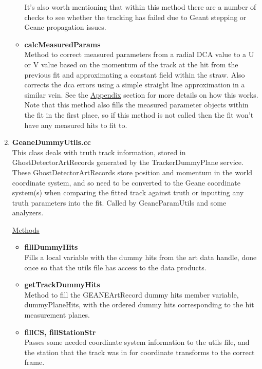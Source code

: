 \begin{enumerate}
\begin{itemize}
          It's also worth mentioning that within this method there are a number of checks to see whether the tracking has failed due to Geant stepping or Geane propagation issues.

          \item{\bf{calcMeasuredParams}} \\ 
          Method to correct measured parameters from a radial DCA value to a U or V value based on the momentum of the track at the hit from the previous fit and approximating a constant field within the straw. Also corrects the dca errors using a simple straight line approximation in a similar vein. See the \hyperref[sec:Appendix]{Appendix} section for more details on how this works. Note that this method also fills the measured parameter objects within the fit in the first place, so if this method is not called then the fit won't have any measured hits to fit to.

        \end{itemize}

      \item{\bf{GeaneDummyUtils.cc}} \\
      This class deals with truth track information, stored in GhostDetectorArtRecords generated by the TrackerDummyPlane service. These GhostDetectorArtRecords store position and momentum in the world coordinate system, and so need to be converted to the Geane coordinate system(s) when comparing the fitted track against truth or inputting any truth parameters into the fit. Called by GeaneParamUtils and some analyzers.

      \underline{Methods}

        \begin{itemize}

          \item{\bf{fillDummyHits}} \\
          Fills a local variable with the dummy hits from the art data handle, done once so that the utils file has access to the data products.

          \item{\bf{getTrackDummyHits}} \\
          Method to fill the GEANEArtRecord dummy hits member variable, dummyPlaneHits, with the ordered dummy hits corresponding to the hit measurement planes.

          \item{\bf{fillCS, fillStationStr}} \\
          Passes some needed coordinate system information to the utils file, and the station that the track was in for coordinate transforms to the correct frame.


\end{itemize}
\end{enumerate}
